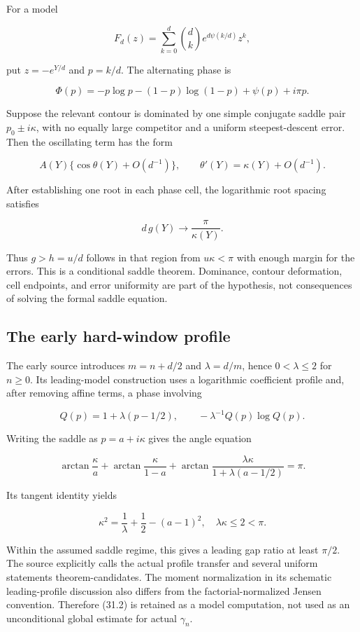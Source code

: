 \documentclass[
  10pt,
  a4paper,
  10pt,
  oneside,
  openany]{book}
\begin{document}
For a model

\[
 F_d(z)=\sum_{k=0}^d\binom dk e^{d\psi(k/d)}z^k,
\]

put \(z=-e^{Y/d}\) and \(p=k/d\). The alternating phase is

\[
 \Phi(p)=-p\log p-(1-p)\log(1-p)+\psi(p)+i\pi p.
\]

Suppose the relevant contour is dominated by one simple conjugate saddle
pair \(p_0\pm i\kappa\), with no equally large competitor and a uniform
steepest-descent error. Then the oscillating term has the form

\[
 A(Y)\{\cos\theta(Y)+O(d^{-1})\},
 \qquad\theta'(Y)=\kappa(Y)+O(d^{-1}).
\]

After establishing one root in each phase cell, the logarithmic root
spacing satisfies

\[
 d\,g(Y)\longrightarrow\frac\pi{\kappa(Y)}.
 \tag{31.1}\label{eq:31.1}
\]

Thus \(g>h=u/d\) follows in that region from \(u\kappa<\pi\) with enough
margin for the errors. This is a conditional saddle theorem. Dominance,
contour deformation, cell endpoints, and error uniformity are part of
the hypothesis, not consequences of solving the formal saddle equation.

\subsection{The early hard-window
profile}\label{the-early-hard-window-profile}

The early source introduces \(m=n+d/2\) and \(\lambda=d/m\), hence
\(0<\lambda\le2\) for \(n\ge0\). Its leading-model construction uses a
logarithmic coefficient profile and, after removing affine terms, a
phase involving

\[
 Q(p)=1+\lambda(p-1/2),\qquad
 -\lambda^{-1}Q(p)\log Q(p).
\]

Writing the saddle as \(p=a+i\kappa\) gives the angle equation

\[
 \arctan\frac\kappa a+
 \arctan\frac\kappa{1-a}+
 \arctan\frac{\lambda\kappa}{1+\lambda(a-1/2)}=\pi.
\]

Its tangent identity yields

\[
 \kappa^2=\frac1\lambda+\frac12-(a-1)^2,
 \quad\lambda\kappa\le2<\pi.
 \tag{31.2}\label{eq:31.2}
\]

Within the assumed saddle regime, this gives a leading gap ratio at
least \(\pi/2\). The source explicitly calls the actual profile transfer
and several uniform statements theorem-candidates. The moment
normalization in its schematic leading-profile discussion also differs
from the factorial-normalized Jensen convention. Therefore (31.2) is
retained as a model computation, not used as an unconditional global
estimate for actual \(\gamma_n\).
\end{document}
